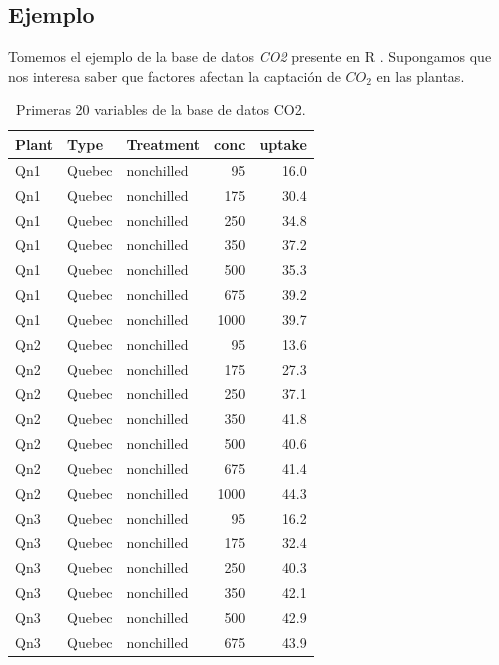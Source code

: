 \documentclass[]{book}
\begin{document}
\hypertarget{ejemplo}{%
\subsection{Ejemplo}\label{ejemplo}}

Tomemos el ejemplo de la base de datos \emph{CO2} presente en R
\citep{potvin1990statistical}. Supongamos que nos interesa saber que
factores afectan la captación de \(CO_2\) en las plantas.

\begin{table}

\caption{\label{tab:TablaCo2}Primeras 20 variables de la base de datos CO2.}
\centering
\begin{tabular}[t]{lllrr}
\toprule
Plant & Type & Treatment & conc & uptake\\
\midrule
Qn1 & Quebec & nonchilled & 95 & 16.0\\
Qn1 & Quebec & nonchilled & 175 & 30.4\\
Qn1 & Quebec & nonchilled & 250 & 34.8\\
Qn1 & Quebec & nonchilled & 350 & 37.2\\
Qn1 & Quebec & nonchilled & 500 & 35.3\\
\addlinespace
Qn1 & Quebec & nonchilled & 675 & 39.2\\
Qn1 & Quebec & nonchilled & 1000 & 39.7\\
Qn2 & Quebec & nonchilled & 95 & 13.6\\
Qn2 & Quebec & nonchilled & 175 & 27.3\\
Qn2 & Quebec & nonchilled & 250 & 37.1\\
\addlinespace
Qn2 & Quebec & nonchilled & 350 & 41.8\\
Qn2 & Quebec & nonchilled & 500 & 40.6\\
Qn2 & Quebec & nonchilled & 675 & 41.4\\
Qn2 & Quebec & nonchilled & 1000 & 44.3\\
Qn3 & Quebec & nonchilled & 95 & 16.2\\
\addlinespace
Qn3 & Quebec & nonchilled & 175 & 32.4\\
Qn3 & Quebec & nonchilled & 250 & 40.3\\
Qn3 & Quebec & nonchilled & 350 & 42.1\\
Qn3 & Quebec & nonchilled & 500 & 42.9\\
Qn3 & Quebec & nonchilled & 675 & 43.9\\
\bottomrule
\end{tabular}
\end{table}
\end{document}
